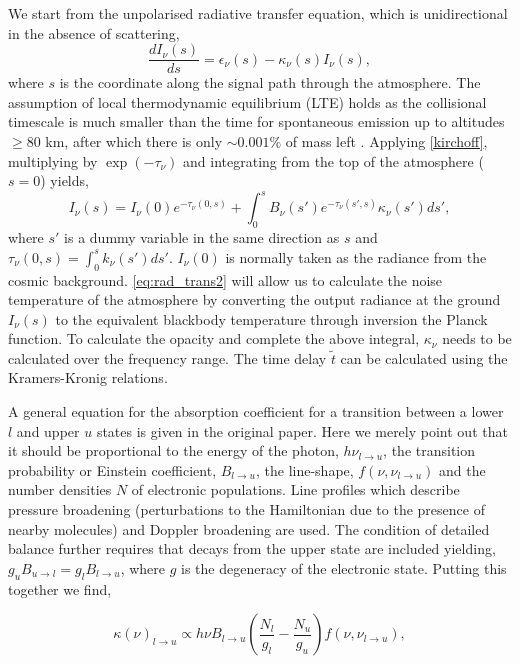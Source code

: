 We start from the unpolarised radiative transfer equation, which is unidirectional in the absence of scattering,
\begin{equation}\label{eq:rad_trans}
\frac{dI_\nu (s) }{ds} = \epsilon_\nu(s) -\kappa_\nu(s)  I_\nu (s),
\end{equation}
where $s$ is the coordinate along the signal path through the atmosphere.  The assumption of local thermodynamic equilibrium (LTE) holds as the collisional timescale is much smaller than the time for spontaneous emission up to altitudes $\ge 80$ km, after which there is only $\sim 0.001\%$ of mass left \citep{Pardo_2001}. Applying \ref{kirchoff}, multiplying by $\exp(-\tau_\nu)$ and integrating from the top of the atmosphere ($s=0$) yields, 
\begin{equation}\label{eq:rad_trans2}
I_\nu(s) = I_\nu(0) e^{-\tau_\nu (0,s) }+ \int_0^s B_\nu(s')e^{-\tau_\nu (s',s) }\kappa_\nu(s')ds',
\end{equation}
where  $s'$ is a dummy variable in the same direction as $s$ and $\tau_\nu (0,s) = \int_0^{s} k_\nu(s')ds'$. $I_\nu(0)$ is normally taken as the radiance from the cosmic background.
\ref{eq:rad_trans2} will allow us to calculate the noise temperature of the atmosphere by converting the output radiance at the ground $I_\nu(s)$ to  the equivalent blackbody temperature through inversion the Planck function. To calculate the opacity and complete the above integral, $\kappa_\nu$ needs to be calculated over the frequency range. The time delay $\tilde{t}$ can be calculated using the Kramers-Kronig relations. 


A general equation for the absorption coefficient for a transition between a lower $l$ and upper $u$ states is given in the original paper. Here we merely point out that it should be proportional to the energy of the photon, $h\nu_{l \to u}$, the transition probability or Einstein coefficient, $ B_{l \to u}$, the line-shape, $f(\nu,\nu_{l \to u})$ and the number densities $N$ of electronic populations. Line profiles which describe pressure broadening (perturbations to the Hamiltonian due to the presence of nearby molecules) and Doppler broadening are used. The condition of detailed balance further requires that decays from the upper state are included yielding, $g_u B_{u \to l} =g_l B_{l \to u}$, where $g$ is the degeneracy of the electronic state. Putting this together we find,

\begin{equation}
\kappa(\nu) _{l \to u}  \propto  h\nu   B_{l \to u}  \left(\frac{N_l}{g_l}  -  \frac{N_u}{g_u} \right) f(\nu,\nu_{l \to u}),
\end{equation}

